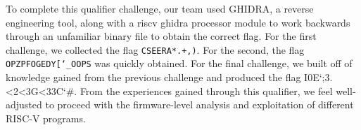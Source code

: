 To complete this qualifier challenge, our team used GHIDRA, a reverse engineering tool, along with a riscv ghidra processor module to work backwards through an unfamiliar binary file to obtain the correct flag. For the first challenge, we collected the flag \texttt{CSEERA*.+,)}. For the second, the flag \texttt{OPZPFOGEDY[\char`_OOPS} was quickly obtained. For the final challenge, we built off of knowledge gained from the previous challenge and produced the flag I0E\char`;3.<2<3G<33C\char`#. From the experiences gained through this qualifier, we feel well-adjusted to proceed with the firmware-level analysis and exploitation of different RISC-V programs.